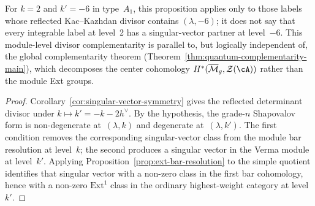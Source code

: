 \begin{proposition}
For $k=2$ and $k'=-6$ in type~$A_1$, this proposition applies only to
those labels whose reflected Kac--Kazhdan divisor contains
$(\lambda,-6)$; it does not say that every integrable label at level~2
has a singular-vector partner at level~$-6$. This module-level
divisor complementarity is parallel to, but logically independent of,
the global complementarity theorem
(Theorem~\ref{thm:quantum-complementarity-main}), which decomposes
the center cohomology $H^*(\overline{\mathcal{M}}_g, \mathcal{Z}(\cA))$
rather than the module Ext groups.
\end{proposition}

\begin{proof}
Corollary~\ref{cor:singular-vector-symmetry} gives the reflected
determinant divisor under $k\mapsto k'=-k-2h^\vee$. By the hypothesis,
the grade-$n$ Shapovalov form is non-degenerate at~$(\lambda,k)$ and
degenerate at~$(\lambda,k')$. The first condition removes the
corresponding singular-vector class from the module bar resolution at
level~$k$; the second produces a singular vector in the Verma module at
level~$k'$. Applying Proposition~\ref{prop:ext-bar-resolution} to the
simple quotient identifies that singular vector with a non-zero class
in the first bar cohomology, hence with a non-zero
$\mathrm{Ext}^1$ class in the ordinary highest-weight category at
level~$k'$.
\end{proof}

